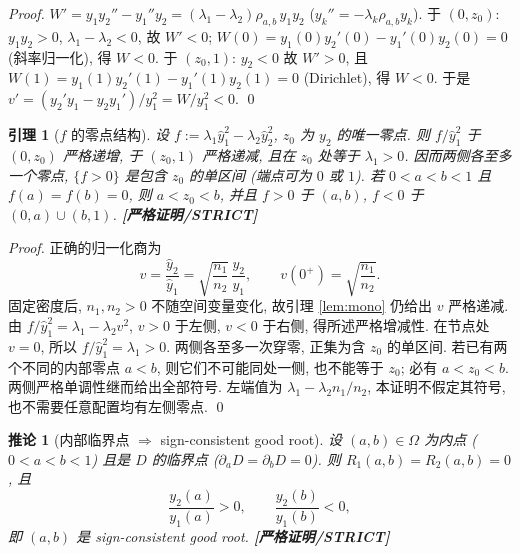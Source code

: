 \documentclass[UTF8]{ctexart}
\newtheorem{lemma}[theorem]{引理}
\newtheorem{corollary}[theorem]{推论}
\newcommand{\STRICT}{\textbf{[严格证明/STRICT]}}
\begin{document}
\begin{proof}
	$W'=y_1y_2''-y_1''y_2=(\lambda_1-\lambda_2)\rho_{a,b}\,y_1y_2$
	($y_k''=-\lambda_k\rho_{a,b}y_k$). 于 $(0,z_0)$: $y_1y_2>0$,
	$\lambda_1-\lambda_2<0$, 故 $W'<0$; $W(0)=y_1(0)y_2'(0)-y_1'(0)y_2(0)=0$
	(斜率归一化), 得 $W<0$. 于 $(z_0,1)$: $y_2<0$ 故 $W'>0$, 且
	$W(1)=y_1(1)y_2'(1)-y_1'(1)y_2(1)=0$ (Dirichlet), 得 $W<0$. 于是
	$v'=(y_2'y_1-y_2y_1')/y_1^2=W/y_1^2<0$. \qed
\end{proof}

\begin{lemma}[$f$ 的零点结构]\label{lem:struct}
设 $f:=\lambda_1\hat y_1^2-\lambda_2\hat y_2^2$, $z_0$ 为 $y_2$ 的唯一零点.
则 $f/\hat y_1^2$ 于 $(0,z_0)$ 严格递增, 于 $(z_0,1)$ 严格递减,
且在 $z_0$ 处等于 $\lambda_1>0$. 因而两侧各至多一个零点,
$\{f>0\}$ 是包含 $z_0$ 的单区间 (端点可为 $0$ 或 $1$).
若 $0<a<b<1$ 且 $f(a)=f(b)=0$, 则 $a<z_0<b$,
并且 $f>0$ 于 $(a,b)$, $f<0$ 于 $(0,a)\cup(b,1)$. \STRICT{}
\end{lemma}

\begin{proof}
	正确的归一化商为
	\[
		v=\frac{\hat y_2}{\hat y_1}
		=\sqrt{\frac{n_1}{n_2}}\,\frac{y_2}{y_1},\qquad
		v(0^+)=\sqrt{\frac{n_1}{n_2}}.
	\]
	固定密度后, $n_1,n_2>0$ 不随空间变量变化, 故引理 \ref{lem:mono}
	仍给出 $v$ 严格递减. 由 $f/\hat y_1^2=\lambda_1-\lambda_2v^2$,
	$v>0$ 于左侧, $v<0$ 于右侧, 得所述严格增减性.
	在节点处 $v=0$, 所以 $f/\hat y_1^2=\lambda_1>0$.
	两侧各至多一次穿零, 正集为含 $z_0$ 的单区间.
	若已有两个不同的内部零点 $a<b$, 则它们不可能同处一侧,
	也不能等于 $z_0$; 必有 $a<z_0<b$. 两侧严格单调性继而给出全部符号.
	左端值为 $\lambda_1-\lambda_2n_1/n_2$, 本证明不假定其符号,
	也不需要任意配置均有左侧零点. \qed
\end{proof}

\begin{corollary}[内部临界点 $\Rightarrow$ sign-consistent good root]\label{cor:goodroot}
设 $(a,b)\in\Omega$ 为内点 ($0<a<b<1$) 且是 $D$ 的临界点
($\partial_aD=\partial_bD=0$). 则 $R_1(a,b)=R_2(a,b)=0$, 且
\begin{equation}
	\frac{y_2(a)}{y_1(a)}>0,\qquad \frac{y_2(b)}{y_1(b)}<0,
\end{equation}
即 $(a,b)$ 是 sign-consistent good root. \STRICT{}
\end{corollary}
\end{document}
